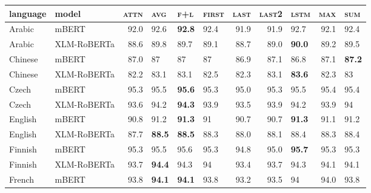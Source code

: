 \begin{tabular}{llrlllrrlrl}
\toprule
\textbf{language} & \textbf{model} &  \textsc{attn} & \textsc{avg} & \textsc{f+l} & \textsc{first} &  \textsc{last} &  \textsc{last2} & \textsc{lstm} &  \textsc{max} & \textsc{sum} \\
\midrule
           Arabic &          mBERT &           92.0 &         92.6 &   \textbf{92.8} &           92.4 &           91.9 &            91.9 &          92.7 &          92.1 &         92.4 \\
           Arabic &    XLM-RoBERTa &           88.6 &         89.8 &         89.7 &           89.1 &           88.7 &            89.0 &    \textbf{90.0} &          89.2 &         89.5 \\
          Chinese &          mBERT &           87.0 &           87 &           87 &             87 &           86.9 &            87.1 &          86.8 &          87.1 &   \textbf{87.2} \\
          Chinese &    XLM-RoBERTa &           82.2 &         83.1 &         83.1 &           82.5 &           82.3 &            83.1 &    \textbf{83.6} &          82.3 &           83 \\
            Czech &          mBERT &           95.3 &         95.5 &   \textbf{95.6} &           95.3 &           95.0 &            95.3 &          95.5 &          95.4 &         95.4 \\
            Czech &    XLM-RoBERTa &           93.6 &         94.2 &   \textbf{94.3} &           93.9 &           93.5 &            93.9 &          94.2 &          93.9 &           94 \\
          English &          mBERT &           90.8 &         91.2 &   \textbf{91.3} &             91 &           90.7 &            90.7 &    \textbf{91.3} &          91.1 &         91.2 \\
          English &    XLM-RoBERTa &           87.7 &   \textbf{88.5} &   \textbf{88.5} &           88.3 &           88.0 &            88.1 &          88.4 &          88.3 &         88.4 \\
          Finnish &          mBERT &           95.3 &         95.5 &         95.6 &           95.3 &           94.8 &            95.0 &    \textbf{95.7} &          95.3 &         95.3 \\
          Finnish &    XLM-RoBERTa &           93.7 &   \textbf{94.4} &         94.3 &             94 &           93.4 &            93.7 &          94.3 &          94.1 &         94.1 \\
           French &          mBERT &           93.8 &   \textbf{94.1} &   \textbf{94.1} &           93.8 &           93.2 &            93.5 &            94 &          94.0 &         93.8 \\

\end{tabular}
